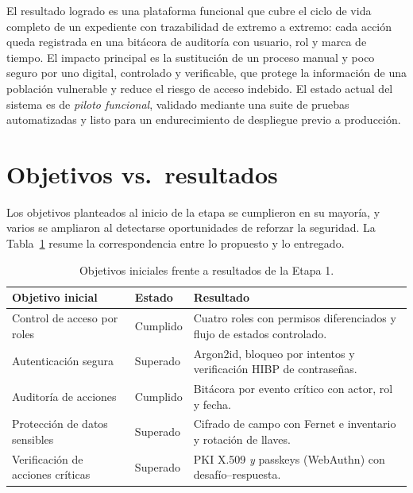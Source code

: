 \documentclass[10pt,letterpaper]{report}
\begin{document}
El resultado logrado es una plataforma funcional que cubre el ciclo de vida
completo de un expediente con trazabilidad de extremo a extremo: cada acción
queda registrada en una bitácora de auditoría con usuario, rol y marca de
tiempo. El impacto principal es la sustitución de un proceso manual y poco
seguro por uno digital, controlado y verificable, que protege la información de
una población vulnerable y reduce el riesgo de acceso indebido. El estado actual
del sistema es de \emph{piloto funcional}, validado mediante una suite de
pruebas automatizadas y listo para un endurecimiento de despliegue previo a
producción.

\section{Objetivos vs.\ resultados}

Los objetivos planteados al inicio de la etapa se cumplieron en su mayoría, y
varios se ampliaron al detectarse oportunidades de reforzar la seguridad. La
Tabla~\ref{tab:obj} resume la correspondencia entre lo propuesto y lo entregado.

\begin{table}[h]
\centering
\renewcommand{\arraystretch}{1.2}
\begin{tabular}{>{\raggedright\arraybackslash}p{6.0cm} >{\raggedright\arraybackslash}p{2.0cm} >{\raggedright\arraybackslash}p{6.0cm}}
\toprule
\textbf{Objetivo inicial} & \textbf{Estado} & \textbf{Resultado} \\
\midrule
Control de acceso por roles & Cumplido & Cuatro roles con permisos diferenciados y flujo de estados controlado. \\
Autenticación segura & Superado & Argon2id, bloqueo por intentos y verificación HIBP de contraseñas. \\
Auditoría de acciones & Cumplido & Bitácora por evento crítico con actor, rol y fecha. \\
Protección de datos sensibles & Superado & Cifrado de campo con Fernet e inventario y rotación de llaves. \\
Verificación de acciones críticas & Superado & PKI X.509 \emph{y} passkeys (WebAuthn) con desafío--respuesta. \\
\bottomrule
\end{tabular}
\caption{Objetivos iniciales frente a resultados de la Etapa 1.}
\label{tab:obj}
\end{table}
\end{document}

